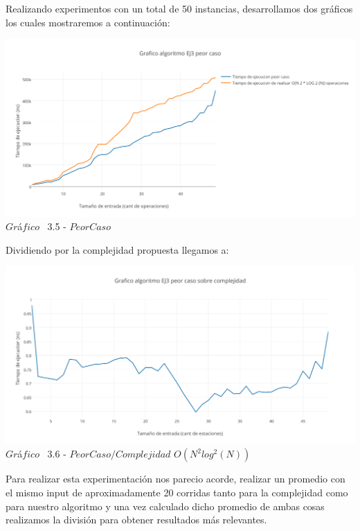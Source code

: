 Realizando experimentos con un total de 50 instancias, desarrollamos dos gr\'aficos los cuales mostraremos a continuaci\'on: \\

\vspace*{0.3cm} \vspace*{0.3cm}
  \begin{center}
 \includegraphics[scale=0.65]{./EJ3/peorcaso.png}
 {$Gr$\'a$fico$ \ 3.5 - $Peor Caso$}
  \end{center}
  \vspace*{0.3cm}


Dividiendo por la complejidad propuesta llegamos a:\\

\vspace*{0.3cm} \vspace*{0.3cm}
  \begin{center}
 \includegraphics[scale=0.65]{./EJ3/peorcaso1.png}
 {$Gr$\'a$fico$ \ 3.6 - $Peor Caso / Complejidad$ $O(N^2 log^2(N))$}
  \end{center}
  \vspace*{0.3cm}

Para realizar esta experimentaci\'on nos parecio acorde, realizar un promedio con el mismo input de aproximadamente 20 corridas
tanto para la complejidad como para nuestro algoritmo y una vez calculado dicho promedio de ambas cosas realizamos la divisi\'on para
obtener resultados m\'as relevantes.\\ 

